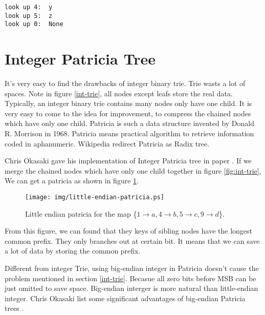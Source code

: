 \documentclass{article}
\begin{document}
\begin{verbatim}
look up 4:  y
look up 5:  z
look up 0:  None
\end{verbatim}

\section{Integer Patricia Tree} 
\label{int-patricia}

It's very easy to find the drawbacks of integer binary trie. Trie wasts a lot of 
spaces. Note in figure \ref{int-trie}, all nodes except leafs store the real data.
Typically, an integer binary trie contains many nodes only have one child.
It is very easy to come to the idea for improvement, to compress the chained nodes
which have only one child. Patricia is such a data structure invented by 
Donald R. Morrison in 1968. Patricia means practical algorithm to retrieve information coded
in aphanumeric\cite{patricia-morrison}. Wikipedia redirect Patricia as Radix tree.

Chris Okasaki gave his implementation of Integer Patricia tree in paper \cite{okasaki-int-map}. 
If we merge the chained nodes which have only one child together in figure \ref{fig:int-trie},
We can get a patricia as shown in figure \ref{fig:little-endian-patricia}.

\begin{figure}[htbp]
       \begin{center}
	\texttt{[image: img/little-endian-patricia.ps]}
        \caption{Little endian patricia for the map 
                        \{$ 1 \rightarrow a, 4 \rightarrow b, 5 \rightarrow c, 9 \rightarrow d$\}.} 
        \label{fig:little-endian-patricia}
       \end{center}
\end{figure}

From this figure, we can found that they keys of sibling nodes have the longest common prefix.
They only branches out at certain bit. It means that we can save a lot of data by storing the common
prefix. 

Different from integer Trie, using big-endian integer in Patricia doesn't cause the problem mentioned
in section \ref{int-trie}. Becasue all zero bits before MSB can be just omitted to save space. Big-endian
interger is more natural than little-endian integer. Chris Okasaki list some significant advantages
of big-endian Patricia trees \cite{okasaki-int-map}.
\end{document}
